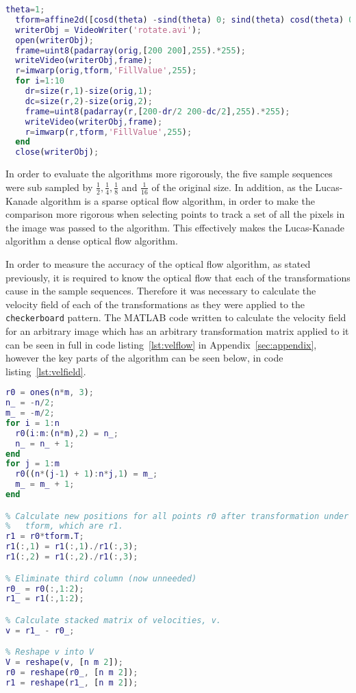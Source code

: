 \singlespacing
\begin{lstlisting}[language=MATLAB,caption={MATLAB code for creating rotation sample sequence},label=lst:rotation]
  theta=1;
  tform=affine2d([cosd(theta) -sind(theta) 0; sind(theta) cosd(theta) 0; 0 0 1]);
  writerObj = VideoWriter('rotate.avi');
  open(writerObj);
  frame=uint8(padarray(orig,[200 200],255).*255);
  writeVideo(writerObj,frame);
  r=imwarp(orig,tform,'FillValue',255);
  for i=1:10
    dr=size(r,1)-size(orig,1);
    dc=size(r,2)-size(orig,2);
    frame=uint8(padarray(r,[200-dr/2 200-dc/2],255).*255);
    writeVideo(writerObj,frame);
    r=imwarp(r,tform,'FillValue',255);
  end
  close(writerObj);
\end{lstlisting}
\onehalfspacing

In order to evaluate the algorithms more rigorously, the five sample sequences were sub sampled by $\frac{1}{2}, \frac{1}{4}, \frac{1}{8}$ and $\frac{1}{16}$ of the original size. In addition, as the Lucas-Kanade algorithm is a sparse optical flow algorithm, in order to make the comparison more rigorous when selecting points to track a set of all the pixels in the image was passed to the algorithm. This effectively makes the Lucas-Kanade algorithm a dense optical flow algorithm.

In order to measure the accuracy of the optical flow algorithm, as stated previously, it is required to know the optical flow that each of the transformations cause in the sample sequences. Therefore it was necessary to calculate the velocity field of each of the transformations as they were applied to the \verb|checkerboard| pattern. The MATLAB code written to calculate the velocity field for an arbitrary image which has an arbitrary transformation matrix applied to it can be seen in full in code listing~\ref{lst:velflow} in Appendix~\ref{sec:appendix}, however the key parts of the algorithm can be seen below, in code listing~\ref{lst:velfield}.

\singlespacing
\begin{lstlisting}[language=MATLAB,caption={MATLAB code to calculate the velocity field of a transformation matrix},label=lst:velfield]
% Set up matrix of points r0.
r0 = ones(n*m, 3);
n_ = -n/2;
m_ = -m/2;
for i = 1:n
  r0(i:m:(n*m),2) = n_;
  n_ = n_ + 1;
end
for j = 1:m
  r0((n*(j-1) + 1):n*j,1) = m_;
  m_ = m_ + 1;
end

% Calculate new positions for all points r0 after transformation under
%   tform, which are r1.
r1 = r0*tform.T;
r1(:,1) = r1(:,1)./r1(:,3);
r1(:,2) = r1(:,2)./r1(:,3);

% Eliminate third column (now unneeded)
r0_ = r0(:,1:2);
r1_ = r1(:,1:2);

% Calculate stacked matrix of velocities, v.
v = r1_ - r0_;

% Reshape v into V
V = reshape(v, [n m 2]);
r0 = reshape(r0_, [n m 2]);
r1 = reshape(r1_, [n m 2]);
\end{lstlisting}
\onehalfspacing

